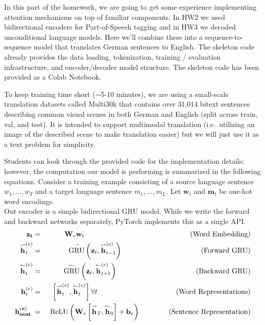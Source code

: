 \documentclass[a4paper,10pt]{article}
\begin{document}
In this part of the homework, we are going to get some experience implementing attention mechanisms on top of familiar components. In HW2 we used bidirectional encoders for Part-of-Speech tagging and in HW3 we decoded unconditional language models. Here we'll combine these into a sequence-to-sequence model that translates German sentences to English. The skeleton code already provides the data loading, tokenization, training / evaluation infrastructure,  and encoder/decoder model structure. The skeleton code has been provided as a Colab Notebook.


To keep training time short ($\sim$5-10 minutes), we are using a small-scale translation datasets called Multi30k \cite{elliott2016multi30k} that contains over 31,014 bitext sentences describing common visual scenes in both German and English (split across train, val, and test). It is intended to support multimodal translation (i.e.~utilizing an image of the described scene to make translation easier) but we will just use it as a text problem for simplicity. 



\renewcommand{\overrightarrow}{\overset{\rightharpoonup}}
\renewcommand{\overleftarrow}{\overset{\mathbf{\leftharpoonup}}}

Students can look through the provided code for the implementation details; however, the computation our model is performing is summarized in the following equations. Consider a training example consisting of a source language sentence $w_1, ..., w_T$ and a target language sentence $m_1, ..., m_L$. Let $\mathbf{w}_{t}$ and $\mathbf{m}_t$ be one-hot word encodings.\\


 Out encoder is a simple bidirectional GRU model. While we write the forward and backward networks separately, PyTorch implements this as a single API.
\begin{eqnarray}
\mathbf{z_t} &=& \mathbf{W}_e\mathbf{w}_{t} \mbox{\hspace{148pt}(Word Embedding)}\\
\overrightarrow{\mathbf{h}}_t^{(e)} &=& \overrightarrow{\mbox{GRU}}\left(\textbf{z}_t, \overrightarrow{\mathbf{h}}_{t-1}^{(e)}\right) \mbox{\hspace{110pt}(Forward GRU)}\\
\overleftarrow{\mathbf{h}}_t^{(e)} &=& \overleftarrow{\mbox{GRU}}\left(\textbf{z}_t, \overleftarrow{\mathbf{h}}_{t+1}^{(e)}\right) \mbox{\hspace{110pt}(Backward GRU)}\\
\mathbf{h}_t^{(e)} &=& \left[\overrightarrow{\mathbf{h}}_t^{(e)}, \overleftarrow{\mathbf{h}}_t^{(e)}\right] \forall t\mbox{\hspace{110pt}(Word Representations)}\\ \mathbf{h^{(e)}_{sent.}} &=& \mbox{ ReLU}\left(\mathbf{W}_e\left[\overrightarrow{\mathbf{h}}_T, \overleftarrow{\mathbf{h}}_0\right] + \mathbf{b}_e\right) \mbox{\hspace{40pt}(Sentence Representation)}
\end{eqnarray}
\end{document}
